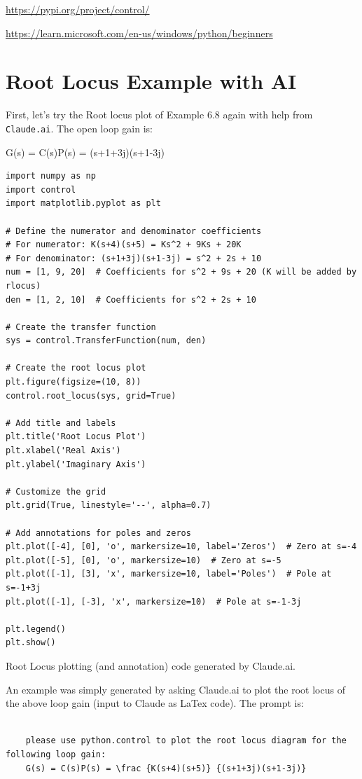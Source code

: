 \href{python control}{https://pypi.org/project/control/}

\href{Install Python on Windows}{https://learn.microsoft.com/en-us/windows/python/beginners}


\section{Root Locus Example with AI}

First, let's try the Root locus plot of Example 6.8 again with help from {\tt Claude.ai}.
The open loop gain is:

\beq\label{pythonRLsystem}
G(s) = C(s)P(s) =  {(s+1+3j)(s+1-3j)}
\eeq


\begin{listing}
    \begin{verbatim}
import numpy as np
import control
import matplotlib.pyplot as plt

# Define the numerator and denominator coefficients
# For numerator: K(s+4)(s+5) = Ks^2 + 9Ks + 20K
# For denominator: (s+1+3j)(s+1-3j) = s^2 + 2s + 10
num = [1, 9, 20]  # Coefficients for s^2 + 9s + 20 (K will be added by rlocus)
den = [1, 2, 10]  # Coefficients for s^2 + 2s + 10

# Create the transfer function
sys = control.TransferFunction(num, den)

# Create the root locus plot
plt.figure(figsize=(10, 8))
control.root_locus(sys, grid=True)

# Add title and labels
plt.title('Root Locus Plot')
plt.xlabel('Real Axis')
plt.ylabel('Imaginary Axis')

# Customize the grid
plt.grid(True, linestyle='--', alpha=0.7)

# Add annotations for poles and zeros
plt.plot([-4], [0], 'o', markersize=10, label='Zeros')  # Zero at s=-4
plt.plot([-5], [0], 'o', markersize=10)  # Zero at s=-5
plt.plot([-1], [3], 'x', markersize=10, label='Poles')  # Pole at s=-1+3j
plt.plot([-1], [-3], 'x', markersize=10)  # Pole at s=-1-3j

plt.legend()
plt.show()
    \end{verbatim}
    \caption{Root Locus plotting (and annotation) code generated by Claude.ai.}
    \label{lst:RLGenByAI}
\end{listing}


An example was simply generated by asking Claude.ai to plot the root locus of the above loop gain (input to Claude as LaTex code). The prompt is:
\begin{verbatim}

    please use python.control to plot the root locus diagram for the following loop gain:
    G(s) = C(s)P(s) = \frac {K(s+4)(s+5)} {(s+1+3j)(s+1-3j)}
\end{verbatim}

